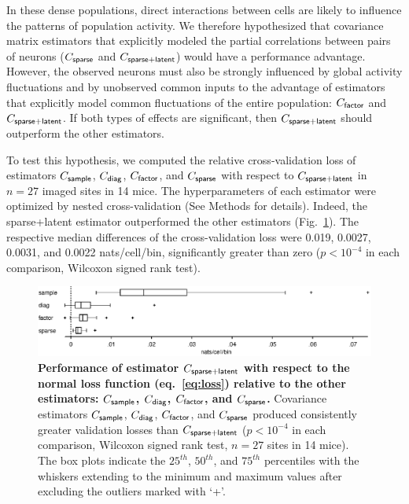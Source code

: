 \documentclass[10pt]{article}
\begin{document}
In these dense populations, direct interactions between cells are likely to influence the patterns of population activity.  We therefore hypothesized that covariance matrix estimators that explicitly modeled the partial correlations between pairs of neurons ($C_{\sf sparse}$ and $C_{\sf sparse+latent}$) would have a performance advantage.  However, the observed neurons must also be strongly influenced by global activity fluctuations and by unobserved common inputs to the advantage of estimators that explicitly model common fluctuations of the entire population: $C_{\sf factor}$ and $C_{\sf sparse+latent}$.  If both types of effects are significant, then $C_{\sf sparse+latent}$ should outperform the other estimators.

To test this hypothesis, we computed the relative cross-validation loss of estimators  $C_{\sf sample}$, $C_{\sf diag}$, $C_{\sf factor}$, and $C_{\sf sparse}$ with respect to $C_{\sf sparse+latent}$ in $n=27$ imaged sites in 14 mice.  The hyperparameters of each estimator were optimized by nested cross-validation (See Methods for details). Indeed, the sparse+latent estimator outperformed the other estimators (Fig.~\ref{fig:3}). The respective median differences of the cross-validation loss were 0.019, 0.0027, 0.0031, and 0.0022 nats/cell/bin, significantly greater than zero ($p<10^{-4}$ in each comparison, Wilcoxon signed rank test).  

\begin{figure}[!ht]
    \begin{center}
    \includegraphics{./figures/src/Fig3.eps}
    \end{center}
    \caption{
   {\bf Performance of estimator $C_{\sf sparse+latent}$ with respect to the normal loss function (eq.~\ref{eq:loss}) relative to the other estimators: $C_{\sf sample}$, $C_{\sf diag}$, $C_{\sf factor}$, and $C_{\sf sparse}$.} 
    Covariance estimators $C_{\sf sample}$, $C_{\sf diag}$, $C_{\sf factor}$, and $C_{\sf sparse}$ produced consistently greater validation losses than $C_{\sf sparse+latent}$ ($p<10^{-4}$ in each comparison, Wilcoxon signed rank test, $n=27$ sites in 14 mice). The box plots indicate the $25^{th}$, $50^{th}$, and $75^{th}$ percentiles with the whiskers extending to the minimum and maximum values after excluding the outliers marked with `+'. 
} \label{fig:3}
\end{figure}
\end{document}
